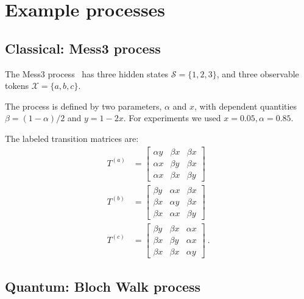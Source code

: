 \documentclass[prx,nofootinbib,onecolumn,showkeys,groupaddress,preprintnumbers,floatfix,
superscriptaddress]{revtex4-1}
\newcommand{\SSet}{\boldsymbol{\mathcal{S}}}
\begin{document}
 \section{Example processes}
\label{app:ExampleProcesses}

 
\subsection{Classical: Mess3 process}
 
The Mess3 process~\cite{Marz17a, Shai24_Transformers, Piotrowski25_Constrained} has three hidden states 
 $\SSet = \{ 1, 2, 3\}$, and
three observable tokens $\mathcal{X} = \{ a, b, c \}$.

The process is defined by two parameters,
 $\alpha$ and $x$,
 with dependent quantities
 $\beta = (1-\alpha)/2$ and $y = 1-2x$. For experiments we used $x=0.05, \alpha=0.85$.

 
 The labeled transition matrices are:
 \begin{align}
 T^{(a)} &= 
 \begin{bmatrix}
 	\alpha y & \beta x & \beta x \\
 	\alpha x & \beta y & \beta x \\
 	\alpha x & \beta x & \beta y
 \end{bmatrix}
 \\
  T^{(b)} &= 
 \begin{bmatrix}
 	\beta y & \alpha x & \beta x \\
 	\beta x & \alpha y & \beta x \\
 	\beta x & \alpha x & \beta y
 \end{bmatrix}
 \\
   T^{(c)} &= 
 \begin{bmatrix}
 	\beta y & \beta x & \alpha x \\
 	\beta x & \beta y & \alpha x \\
 	\beta x & \beta x & \alpha y
 \end{bmatrix} ~.
 \end{align}

\subsection{Quantum: Bloch Walk process}



\end{document}
